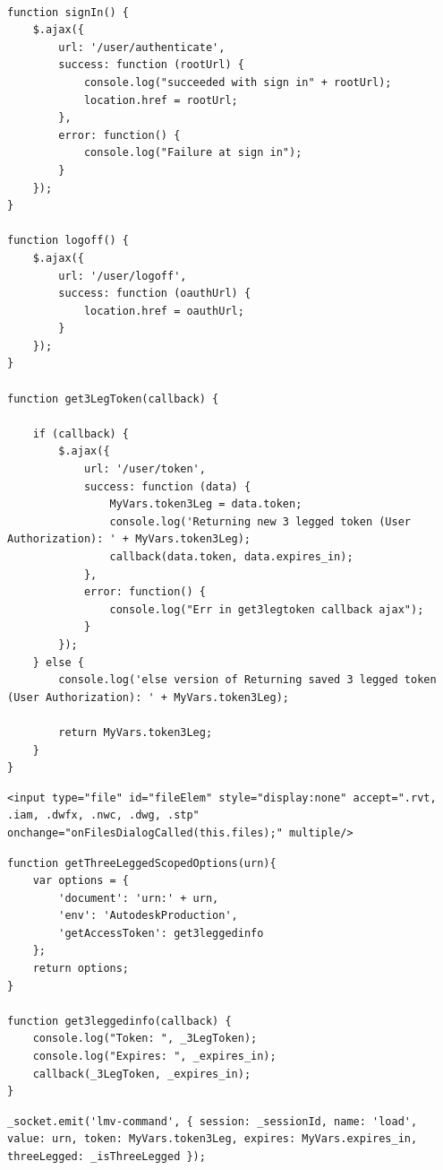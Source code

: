 \documentclass[letterpaper, 10pt, draftclsnofoot, compsoc, onecolumn]{IEEEtran}
\begin{document}
\begin{lstlisting}[caption=Login related functions]

function signIn() {
    $.ajax({
        url: '/user/authenticate',
        success: function (rootUrl) {
            console.log("succeeded with sign in" + rootUrl);
            location.href = rootUrl;
        },
        error: function() {
            console.log("Failure at sign in");
        }
    });
}

function logoff() {
    $.ajax({
        url: '/user/logoff',
        success: function (oauthUrl) {
            location.href = oauthUrl;
        }
    });
}

function get3LegToken(callback) {

    if (callback) {
        $.ajax({
            url: '/user/token',
            success: function (data) {
                MyVars.token3Leg = data.token;
                console.log('Returning new 3 legged token (User Authorization): ' + MyVars.token3Leg);
                callback(data.token, data.expires_in);
            },
            error: function() {
                console.log("Err in get3legtoken callback ajax");
            }
        });
    } else {
        console.log('else version of Returning saved 3 legged token (User Authorization): ' + MyVars.token3Leg);

        return MyVars.token3Leg;
    }
}

\end{lstlisting}
\begin{lstlisting}[caption=local file upload restriction]
<input type="file" id="fileElem" style="display:none" accept=".rvt, .iam, .dwfx, .nwc, .dwg, .stp" onchange="onFilesDialogCalled(this.files);" multiple/>
\end{lstlisting}
\begin{lstlisting}[caption=non-local file upload restriction]
function getThreeLeggedScopedOptions(urn){
    var options = {
        'document': 'urn:' + urn,
        'env': 'AutodeskProduction',
        'getAccessToken': get3leggedinfo
    };
    return options;   
}

function get3leggedinfo(callback) {
    console.log("Token: ", _3LegToken);
    console.log("Expires: ", _expires_in);
    callback(_3LegToken, _expires_in);
}
\end{lstlisting}
\begin{lstlisting}[caption=socket.io for passing three legged information]
_socket.emit('lmv-command', { session: _sessionId, name: 'load', value: urn, token: MyVars.token3Leg, expires: MyVars.expires_in, threeLegged: _isThreeLegged });
\end{lstlisting}
\end{document}
